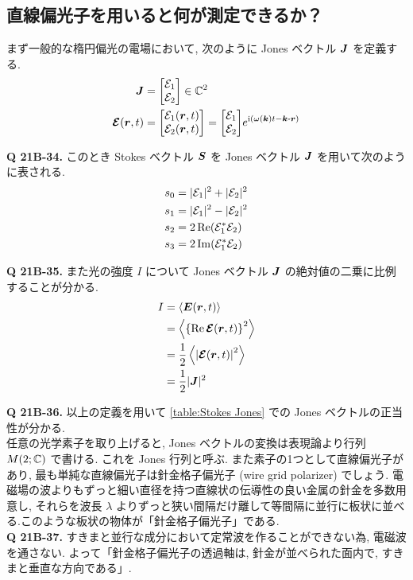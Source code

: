 \documentclass[a4paper,dvipdfmx]{jsarticle}
\theoremstyle{definition}
\begin{document}
\subsection{直線偏光子を用いると何が測定できるか？}
まず一般的な楕円偏光の電場において, 次のように Jones ベクトル $\vb*{J}$ を定義する.
\begin{align}
  \JJ         & = \mqty[\Ec_1         \\ \Ec_2]\in\CC^2 \\
  \EC(\rr, t) & = \mqty[\Ec_1(\rr, t) \\ \Ec_2(\rr, t)] = \mqty[\Ec_1 \\ \Ec_2]e^{\ii(\omega(\kk)t - \kk\vdot\rr)}
\end{align}

\textbf{Q 21B-34.}
このとき Stokes ベクトル $\vb*{S}$ を Jones ベクトル $\vb*{J}$ を用いて次のように表される.
\begin{align}
  s_0 & = |\mathcal{E}_1|^2 + |\mathcal{E}_2|^2 \\
  s_1 & = |\mathcal{E}_1|^2 - |\mathcal{E}_2|^2 \\
  s_2 & = 2\Re(\mathcal{E}_1^*\mathcal{E}_2)    \\
  s_3 & = 2\Im(\mathcal{E}_1^*\mathcal{E}_2)
\end{align}

\textbf{Q 21B-35.}
また光の強度 $I$ について Jones ベクトル $\vb*{J}$ の絶対値の二乗に比例することが分かる.
\begin{align}
  I & = \left\langle\vb*{E}(\vb*{r}, t)\right\rangle                   \\
    & = \left\langle\qty{\Re\vb*{\mathcal{E}}(\vb*{r},t)}^2\right\rangle         \\
    & = \frac{1}{2}\left\langle\qty|\vb*{\mathcal{E}}(\vb*{r},t)|^2\right\rangle \\
    & = \frac{1}{2}|\vb*{J}|^2 \label{Jones strength}
\end{align}

\textbf{Q 21B-36.}
以上の定義を用いて \ref{table:Stokes Jones} での Jones ベクトルの正当性が分かる. \\

任意の光学素子を取り上げると, Jones ベクトルの変換は表現論より行列 $M(2; \mathbb{C})$ で書ける. これを Jones 行列と呼ぶ. また素子の1つとして直線偏光子があり, 最も単純な直線偏光子は針金格子偏光子 (wire grid polarizer) でしょう. 電磁場の波よりもずっと細い直径を持つ直線状の伝導性の良い金属の針金を多数用意し, それらを波長 $\lambda$ よりずっと狭い間隔だけ離して等間隔に並行に板状に並べる.このような板状の物体が「針金格子偏光子」である. \\

\textbf{Q 21B-37.}
すきまと並行な成分において定常波を作ることができない為, 電磁波を通さない. よって「針金格子偏光子の透過軸は, 針金が並べられた面内で, すきまと垂直な方向である」. \\
\end{document}
